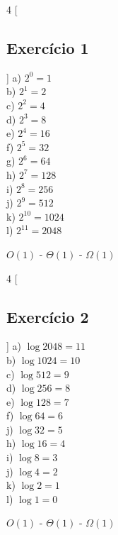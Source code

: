 \documentclass[12pt]{article}
\begin{document}
\begin{multicols}{4}
  [
    \subsection{Exercício 1}
  ]
  a) $2^{0} = 1$ \\
  b) $2^{1} = 2$ \\
  c) $2^{2} = 4$ \\
  d) $2^{3} = 8$ \\
  e) $2^{4} = 16$ \\
  f) $2^{5} = 32$ \\
  g) $2^{6} = 64$ \\
  h) $2^{7} = 128$ \\
  i) $2^{8} = 256$ \\
  j) $2^{9} = 512$ \\
  k) $2^{10} = 1024$ \\
  l) $2^{11} = 2048$ \\
  \end{multicols}
  $O(1)$ - $\Theta(1)$ - $\Omega(1)$

\begin{multicols}{4}
  [
    \subsection{Exercício 2}
  ]
  a) $\log{2048} = 11$ \\
  b) $\log{1024} = 10$ \\
  c) $\log{512} = 9$ \\
  d) $\log{256} = 8$ \\
  e) $\log{128} = 7$ \\
  f) $\log{64} = 6$ \\
  j) $\log{32} = 5$ \\
  h) $\log{16} = 4$ \\
  i) $\log{8} = 3$ \\
  j) $\log{4} = 2$ \\
  k) $\log{2} = 1$ \\
  l) $\log{1} = 0$
\end{multicols}
$O(1)$ - $\Theta(1)$ - $\Omega(1)$
\end{document}
